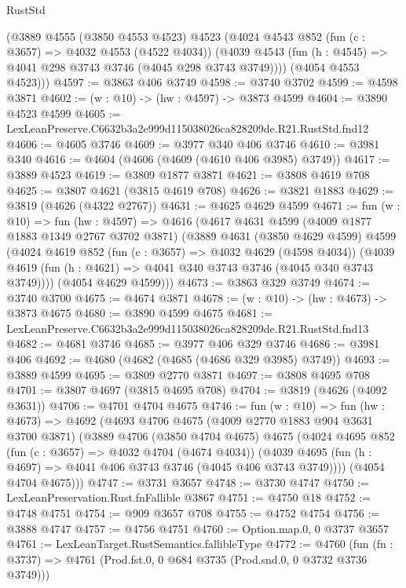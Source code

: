 \begin{lexlean}{RustStd}
\begin{coremodule}
      (@3889
        @4555
        (@3850 @4553 @4523)
        @4523
        (@4024
          @4543
          @852
          (fun (c : @3657) => @4032 @4553 (@4522 @4034))
          (@4039 @4543 (fun (h : @4545) => @4041 @298 @3743 @3746 (@4045 @298 @3743 @3749))))
        (@4054 @4553 @4523)))
@4597 := @3863 @406 @3749
@4598 := @3740 @3702
@4599 := @4598 @3871
@4602 := (w : @10) -> (hw : @4597) -> @3873 @4599
@4604 := @3890 @4523 @4599
@4605 := LexLeanPreserve.C6632b3a2e999d115038026ca828209de.R21.RustStd.fnd12
@4606 := @4605 @3746
@4609 := @3977 @340 @406 @3746
@4610 := @3981 @340
@4616 := @4604 (@4606 (@4609 (@4610 @406 @3985) @3749))
@4617 := @3889 @4523
@4619 := @3809 @1877 @3871
@4621 := @3808 @4619 @708
@4625 := @3807 @4621 (@3815 @4619 @708)
@4626 := @3821 @1883
@4629 := @3819 (@4626 (@4322 @2767))
@4631 := @4625 @4629 @4599
@4671 := fun (w : @10) =>
  fun (hw : @4597) =>
  @4616
    (@4617
      @4631
      @4599
      (@4009 @1877 @1883 @1349 @2767 @3702 @3871)
      (@3889
        @4631
        (@3850 @4629 @4599)
        @4599
        (@4024
          @4619
          @852
          (fun (c : @3657) => @4032 @4629 (@4598 @4034))
          (@4039 @4619 (fun (h : @4621) => @4041 @340 @3743 @3746 (@4045 @340 @3743 @3749))))
        (@4054 @4629 @4599)))
@4673 := @3863 @329 @3749
@4674 := @3740 @3700
@4675 := @4674 @3871
@4678 := (w : @10) -> (hw : @4673) -> @3873 @4675
@4680 := @3890 @4599 @4675
@4681 := LexLeanPreserve.C6632b3a2e999d115038026ca828209de.R21.RustStd.fnd13
@4682 := @4681 @3746
@4685 := @3977 @406 @329 @3746
@4686 := @3981 @406
@4692 := @4680 (@4682 (@4685 (@4686 @329 @3985) @3749))
@4693 := @3889 @4599
@4695 := @3809 @2770 @3871
@4697 := @3808 @4695 @708
@4701 := @3807 @4697 (@3815 @4695 @708)
@4704 := @3819 (@4626 (@4092 @3631))
@4706 := @4701 @4704 @4675
@4746 := fun (w : @10) =>
  fun (hw : @4673) =>
  @4692
    (@4693
      @4706
      @4675
      (@4009 @2770 @1883 @904 @3631 @3700 @3871)
      (@3889
        @4706
        (@3850 @4704 @4675)
        @4675
        (@4024
          @4695
          @852
          (fun (c : @3657) => @4032 @4704 (@4674 @4034))
          (@4039 @4695 (fun (h : @4697) => @4041 @406 @3743 @3746 (@4045 @406 @3743 @3749))))
        (@4054 @4704 @4675)))
@4747 := @3731 @3657
@4748 := @3730 @4747
@4750 := LexLeanPreservation.Rust.fnFallible @3867
@4751 := @4750 @18
@4752 := @4748 @4751
@4754 := @909 @3657 @708
@4755 := @4752 @4754
@4756 := @3888 @4747
@4757 := @4756 @4751
@4760 := Option.map.{0, 0} @3737 @3657
@4761 := LexLeanTarget.RustSemantics.fallibleType
@4772 := @4760
    (fun (fn : @3737) => @4761 (Prod.fst.{0, 0} @684 @3735 (Prod.snd.{0, 0} @3732 @3736 @3749)))

\end{coremodule}
\end{lexlean}
